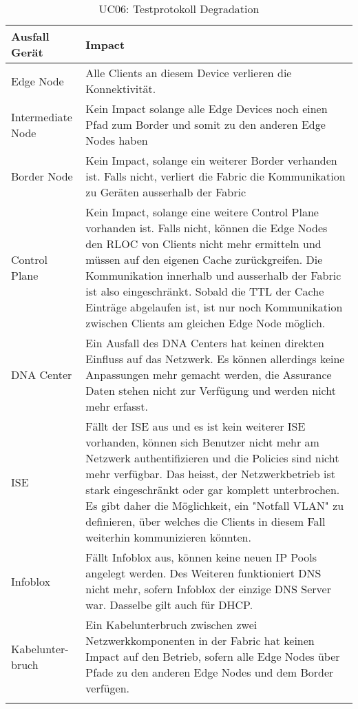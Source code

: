 \begin{landscape}
\begin{longtable}{| m{2.5cm} | m{21.5cm} |}
		\hline
		\textbf{Ausfall Gerät}  & \textbf{Impact}        \\
		\hline
		Edge Node  & Alle Clients an diesem Device verlieren die Konnektivität.  \\ 
		\hline
		Intermediate Node & Kein Impact solange alle Edge Devices noch einen Pfad zum Border und somit zu den anderen Edge Nodes haben \\ 
		\hline
		Border Node & Kein Impact, solange ein weiterer Border verhanden ist. Falls nicht, verliert die Fabric die Kommunikation zu Geräten ausserhalb der Fabric \\
		\hline
		Control Plane & Kein Impact, solange eine weitere Control Plane vorhanden ist. Falls nicht, können die Edge Nodes den RLOC von Clients nicht mehr ermitteln und müssen auf den eigenen Cache zurückgreifen. Die Kommunikation innerhalb und ausserhalb der Fabric ist also eingeschränkt. Sobald die TTL der Cache Einträge abgelaufen ist, ist nur noch Kommunikation zwischen Clients am gleichen Edge Node möglich. \\
		\hline
		DNA Center & Ein Ausfall des DNA Centers hat keinen direkten Einfluss auf das Netzwerk. Es können allerdings keine Anpassungen mehr gemacht werden, die Assurance Daten stehen nicht zur Verfügung und werden nicht mehr erfasst. \\
		\hline
		ISE & Fällt der ISE aus und es ist kein weiterer ISE vorhanden, können sich Benutzer nicht mehr am Netzwerk authentifizieren und die Policies sind nicht mehr verfügbar. Das heisst, der Netzwerkbetrieb ist stark eingeschränkt oder gar komplett unterbrochen. Es gibt daher die Möglichkeit, ein "Notfall VLAN" zu definieren, über welches die Clients in diesem Fall weiterhin kommunizieren könnten. \\
		\hline
		Infoblox & Fällt Infoblox aus, können keine neuen IP Pools angelegt werden. Des Weiteren funktioniert DNS nicht mehr, sofern Infoblox der einzige DNS Server war. Dasselbe gilt auch für DHCP. \\
		\hline
		Kabelunter- bruch & Ein Kabelunterbruch zwischen zwei Netzwerkkomponenten in der Fabric hat keinen Impact auf den Betrieb, sofern alle Edge Nodes über Pfade zu den anderen Edge Nodes und dem Border verfügen.\\
		\hline
	\caption{UC06: Testprotokoll Degradation}
	\label{tab:UC06_Testprotokoll}
\end{longtable}
\pagebreak


\end{landscape}
